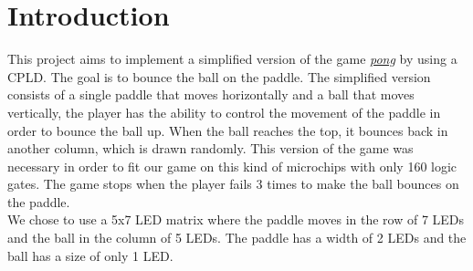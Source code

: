\section{Introduction}

This project aims to implement a simplified version of the game \href{http://www.ponggame.org/}{\textit{pong}} by using a CPLD. The goal is to bounce the ball on the paddle. The simplified version consists of a single paddle that moves horizontally and a ball that moves vertically, the player has the ability to control the movement of the paddle in order to bounce the ball up. When the ball reaches the top, it bounces back in another column, which is drawn randomly. This version of the game was necessary in order to fit our game on this kind of microchips with only 160 logic gates. The game stops when the player fails 3 times to make the ball bounces on the paddle.\\

We chose to use a 5x7 LED matrix where the paddle moves in the row of 7 LEDs and the ball in the column of 5 LEDs. The paddle has a width of 2 LEDs and the ball has a size of only 1 LED.


